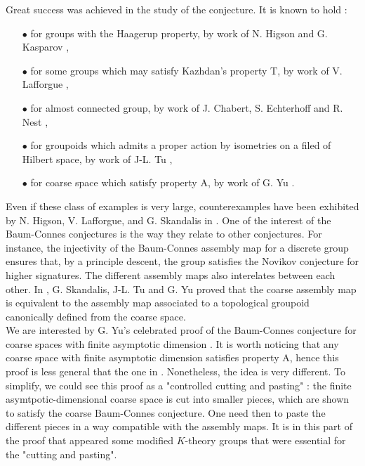 Great success was achieved in the study of the conjecture. It is known to hold :
\begin{itemize}
\item[$\bullet$] for groups with the Haagerup property, by work of N. Higson and G. Kasparov \cite{higsonkasparov},
\item[$\bullet$] for some groups which may satisfy Kazhdan's property T, by work of V. Lafforgue \cite{Lafforgue}, 
\item[$\bullet$] for almost connected group, by work of J. Chabert, S. Echterhoff and R. Nest \cite{chabertEN},
\item[$\bullet$] for groupoids which admits a proper action by isometries on a filed of Hilbert space, by work of J-L. Tu \cite{TuThese},
\item[$\bullet$] for coarse space which satisfy property A, by work of G. Yu \cite{Yu2}.
\end{itemize}  
Even if these class of examples is very large, counterexamples have been exhibited by N. Higson, V. Lafforgue, and G. Skandalis in \cite{HigsonLaffSk}. One of the interest of the Baum-Connes conjectures is the way they relate to other conjectures. For instance, the injectivity of the Baum-Connes assembly map for a discrete group ensures that, by a principle descent, the group satisfies the Novikov conjecture for higher signatures. The different assembly maps also interelates between each other. In \cite{SkTuYu}, G. Skandalis, J-L. Tu and G. Yu proved that the coarse assembly map is equivalent to the assembly map associated to a topological groupoid canonically defined from the coarse space. \\

We are interested by G. Yu's celebrated proof of the Baum-Connes conjecture for coarse spaces with finite asymptotic dimension \cite{Yu1}. It is worth noticing that any coarse space with finite asymptotic dimension satisfies property A, hence this proof is less general that the one in \cite{Yu2}. Nonetheless, the idea is very different. To simplify, we could see this proof as a "controlled cutting and pasting" : the finite asymtpotic-dimensional coarse space is cut into smaller pieces, which are shown to satisfy the coarse Baum-Connes conjecture. One need then to paste the different pieces in a way compatible with the assembly maps. It is in this part of the proof that appeared some modified $K$-theory groups that were essential for the "cutting and pasting". \\


